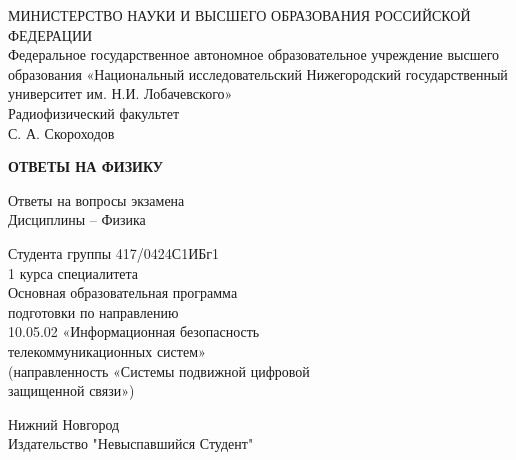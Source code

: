 {\thispagestyle{empty}
\begin{center}
	МИНИСТЕРСТВО НАУКИ И ВЫСШЕГО ОБРАЗОВАНИЯ РОССИЙСКОЙ
	ФЕДЕРАЦИИ\\

	\hfill \break
	Федеральное государственное автономное образовательное учреждение высшего образования «Национальный исследовательский Нижегородский государственный университет им. Н.И. Лобачевского» \\

	\hfill \break
	Радиофизический факультет\\
	\vspace{1.5cm}
	С. А. Скороходов\\
	\begin{center}
		{\huge \textbf{ОТВЕТЫ НА ФИЗИКУ}}
	\end{center}
	\hfill

	{Ответы на вопросы экзамена \\ Дисциплины -- Физика}\\
	\hfill

	Студента группы 417/0424С1ИБг1\\
	1 курса специалитета\\
	\hfill \break
	Основная образовательная программа\\
	подготовки по направлению\\
	10.05.02 «Информационная безопасность\\
	телекоммуникационных систем»\\
	(направленность «Системы подвижной цифровой\\
	защищенной связи»)
\end{center}

\vfill
\begin{center} Нижний Новгород \\ Издательство "Невыспавшийся Студент" \\ \the\year{} \end{center}
\thispagestyle{empty}
\newpage
}
